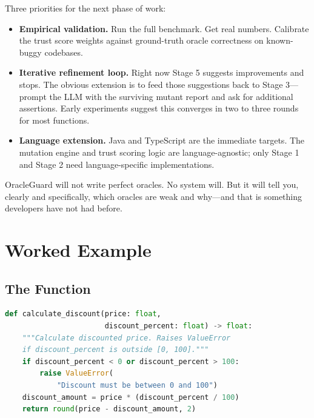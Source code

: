\documentclass[conference]{IEEEtran}
\begin{document}
Three priorities for the next phase of work:

\begin{itemize}
\item \textbf{Empirical validation.} Run the full benchmark. Get real numbers. Calibrate the trust score weights against ground-truth oracle correctness on known-buggy codebases.
\item \textbf{Iterative refinement loop.} Right now Stage 5 suggests improvements and stops. The obvious extension is to feed those suggestions back to Stage 3—prompt the LLM with the surviving mutant report and ask for additional assertions. Early experiments suggest this converges in two to three rounds for most functions.
\item \textbf{Language extension.} Java and TypeScript are the immediate targets. The mutation engine and trust scoring logic are language-agnostic; only Stage 1 and Stage 2 need language-specific implementations.
\end{itemize}

OracleGuard will not write perfect oracles. No system will. But it will tell you, clearly and specifically, which oracles are weak and why—and that is something developers have not had before.




\appendix

\section{Worked Example}

\subsection{The Function}

\begin{lstlisting}[language=Python]
def calculate_discount(price: float,
                       discount_percent: float) -> float:
    """Calculate discounted price. Raises ValueError
    if discount_percent is outside [0, 100]."""
    if discount_percent < 0 or discount_percent > 100:
        raise ValueError(
            "Discount must be between 0 and 100")
    discount_amount = price * (discount_percent / 100)
    return round(price - discount_amount, 2)
\end{lstlisting}
\end{document}
